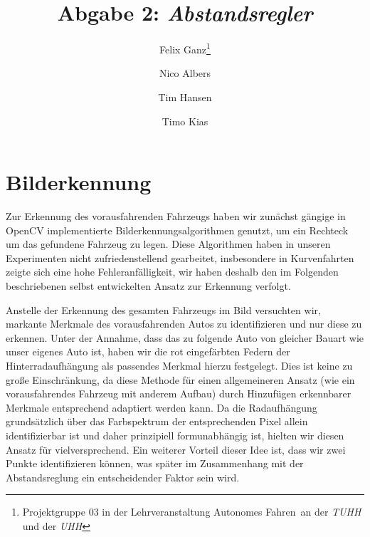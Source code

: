 \documentclass[10pt]{article}
\author{Felix Ganz\thanks{Projektgruppe 03 in der Lehrveranstaltung \glqq{}Autonomes Fahren\grqq\ an der \emph{TUHH} und der \emph{UHH}}\and Nico Albers\footnotemark[1] \and Tim Hansen\footnotemark[1]\and Timo Kias\footnotemark[1]}
\title{Abgabe 2: \emph{Abstandsregler}}
\begin{document}
\maketitle

\section{Bilderkennung}
    Zur Erkennung des vorausfahrenden Fahrzeugs haben wir zunächst gängige in OpenCV implementierte Bilderkennungsalgorithmen genutzt, um ein Rechteck um das gefundene
    Fahrzeug zu legen.
    Diese Algorithmen haben in unseren Experimenten nicht zufriedenstellend gearbeitet, insbesondere in Kurvenfahrten zeigte sich eine hohe Fehleranfälligkeit, wir haben deshalb den im Folgenden beschriebenen selbst entwickelten Ansatz zur Erkennung verfolgt.

    Anstelle der Erkennung des gesamten Fahrzeugs im Bild versuchten wir, markante Merkmale des vorausfahrenden Autos zu identifizieren und nur diese zu erkennen.
    Unter der Annahme, dass das zu folgende Auto von gleicher Bauart wie unser eigenes Auto ist, haben wir die rot eingefärbten Federn der Hinterradaufhängung als passendes Merkmal hierzu festgelegt.
    Dies ist keine zu große Einschränkung, da diese Methode für einen allgemeineren Ansatz (wie ein vorausfahrendes Fahrzeug mit anderem Aufbau) durch Hinzufügen erkennbarer Merkmale entsprechend adaptiert werden kann.
    Da die Radaufhängung grundsätzlich über das Farbspektrum der entsprechenden Pixel allein identifizierbar ist und daher prinzipiell formunabhängig ist, hielten wir diesen Ansatz für vielversprechend.
    Ein weiterer Vorteil dieser Idee ist, dass wir zwei Punkte identifizieren können, was später im Zusammenhang mit der Abstandsreglung ein entscheidender Faktor sein wird.
\end{document}

